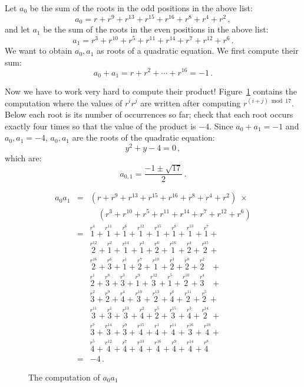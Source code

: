 \documentclass[11pt,a4paper]{article}
\newenvironment{form}[1]{%
\begin{displaymath}%
\renewcommand{\arraystretch}{#1}%
\begin{array}{lcl}}%
{\end{array}%
\end{displaymath}%
}
\newcommand*{\occ}[2]{%
  \stackrel{%
    \textstyle r^{#1}}%
    {\!\!\!\scriptscriptstyle #2}}
\begin{document}

Let $a_0$ be the sum of the roots in the odd positions in the above list:
\[
a_0=r + r^9 + r^{13} +r^{15} +r^{16} + r^8+r^4+r^2\,,
\]
and let $a_1$ be the sum of the roots in the even positions in the above list:
\[
a_1=r^3 + r^{10} + r^{5} +r^{11} +r^{14} + r^7+r^{12}+r^6\,.
\]
We want to obtain $a_0,a_1$ as roots of a quadratic equation. We first compute their sum:
\[
a_0+a_1=r + r^2 + \cdots +r^{16}=-1\,.
\]

Now we have to work very hard to compute their product! Figure~\ref{fig.a0a1} contains the computation where the values of $r^ir^j$ are written after computing $r^{(i+j) \bmod 17}$. Below each root is its number of occurrences so far; check that each root occurs exactly four times so that the value of the product is $-4$. Since $a_0+a_1=-1$ and $a_0,a_1=-4$, $a_0,a_1$ are the roots of the quadratic equation:
\[
y^2+y-4=0\,,
\]
which are:
\[
a_{0,1} = \frac{-1\pm\sqrt{17}}{2}\,.
\]
\begin{figure}[tb]
\begin{form}{1.5}
a_0a_1&=&(r + r^9 + r^{13} +r^{15} +r^{16} + r^8+r^4+r^2)\;\times\\

&&\quad (r^3 + r^{10} + r^{5} +r^{11} +r^{14} + r^7+r^{12}+r^6)\\

&=&\occ{4}{1} + \occ{11}{1} + \occ{6}{1} + \occ{12}{1} + \occ{15}{1} + \occ{8}{1} + \occ{13}{1} + \occ{7}{1} +\\

&&\occ{12}{2} + \occ{2}{1} + \occ{14}{1} + \occ{3}{1} + \occ{6}{2} + \occ{16}{1} + \occ{4}{2} + \occ{15}{2} +\\

&&\occ{16}{2} + \occ{6}{3} + \occ{1}{1} + \occ{7}{2} + \occ{10}{1} + \occ{3}{2} + \occ{8}{2} + \occ{2}{2}\;\;\: +\\

&&\occ{1}{2} + \occ{8}{3} + \occ{3}{3} + \occ{9}{1} + \occ{12}{3} + \occ{5}{1} + \occ{10}{2} + \occ{4}{3}\;\;\: +\\

&&\occ{2}{3} + \occ{9}{2} + \occ{4}{4} + \occ{10}{3} + \occ{13}{2} + \occ{6}{4} + \occ{11}{2} + \occ{5}{2} \:+\\

&&\occ{11}{3} + \occ{1}{3} + \occ{13}{3} + \occ{2}{4} + \occ{5}{2} + \occ{15}{3} + \occ{3}{4} + \occ{14}{2} \;+\\

&&\occ{7}{3} + \occ{14}{3} + \occ{9}{3} + \occ{15}{4} + \occ{1}{4} + \occ{11}{4} + \occ{16}{3} + \occ{10}{4} +\\

&&\occ{5}{4} + \occ{12}{4} + \occ{7}{4} + \occ{13}{4} + \occ{16}{4} + \occ{9}{4} + \occ{14}{4} + \occ{8}{4}\\
&=&-4\,.
\end{form}\vspace{-2em}
\caption{The computation of $a_0a_1$}\label{fig.a0a1}
\end{figure}
\end{document}
